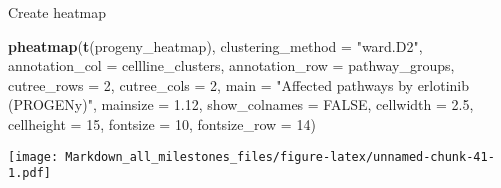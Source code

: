 \documentclass[]{article}
\newenvironment{Shaded}{\begin{snugshade}}{\end{snugshade}}
\newcommand{\DataTypeTok}[1]{\textcolor[rgb]{0.13,0.29,0.53}{#1}}
\newcommand{\DecValTok}[1]{\textcolor[rgb]{0.00,0.00,0.81}{#1}}
\newcommand{\FloatTok}[1]{\textcolor[rgb]{0.00,0.00,0.81}{#1}}
\newcommand{\KeywordTok}[1]{\textcolor[rgb]{0.13,0.29,0.53}{\textbf{#1}}}
\newcommand{\NormalTok}[1]{#1}
\newcommand{\OtherTok}[1]{\textcolor[rgb]{0.56,0.35,0.01}{#1}}
\newcommand{\StringTok}[1]{\textcolor[rgb]{0.31,0.60,0.02}{#1}}
\begin{document}
Create heatmap

\begin{Shaded}
\begin{Highlighting}[]
\KeywordTok{pheatmap}\NormalTok{(}\KeywordTok{t}\NormalTok{(progeny_heatmap),}
         \DataTypeTok{clustering_method =} \StringTok{"ward.D2"}\NormalTok{,}
         \DataTypeTok{annotation_col =}\NormalTok{ cellline_clusters,}
         \DataTypeTok{annotation_row =}\NormalTok{ pathway_groups,}
         \DataTypeTok{cutree_rows =} \DecValTok{2}\NormalTok{,}
         \DataTypeTok{cutree_cols =} \DecValTok{2}\NormalTok{,}
         \DataTypeTok{main =} \StringTok{"Affected pathways by erlotinib (PROGENy)"}\NormalTok{,}
         \DataTypeTok{mainsize =} \FloatTok{1.12}\NormalTok{, }
         \DataTypeTok{show_colnames =} \OtherTok{FALSE}\NormalTok{,}
         \DataTypeTok{cellwidth =} \FloatTok{2.5}\NormalTok{,}
         \DataTypeTok{cellheight =} \DecValTok{15}\NormalTok{, }
         \DataTypeTok{fontsize =} \DecValTok{10}\NormalTok{,}
         \DataTypeTok{fontsize_row =} \DecValTok{14}\NormalTok{)}
\end{Highlighting}
\end{Shaded}

\texttt{[image: Markdown\_all\_milestones\_files/figure-latex/unnamed-chunk-41-1.pdf]}
\end{document}
